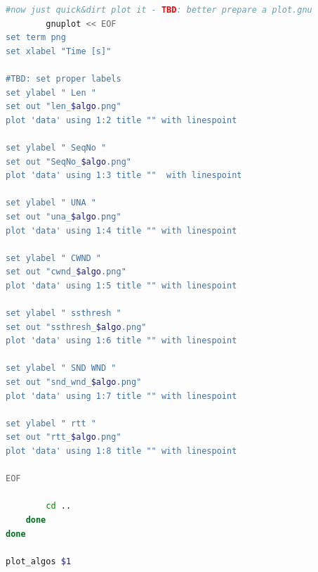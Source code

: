 \documentclass{exam}
\begin{document}
\begin{lstlisting}[language=bash]
		#now just quick&dirt plot it - TBD: better prepare a plot.gnu
		gnuplot << EOF
set term png
set xlabel "Time [s]"

#TBD: set proper labels
set ylabel " Len "
set out "len_$algo.png"
plot 'data' using 1:2 title "" with linespoint

set ylabel " SeqNo "
set out "SeqNo_$algo.png" 
plot 'data' using 1:3 title ""  with linespoint

set ylabel " UNA "
set out "una_$algo.png"
plot 'data' using 1:4 title "" with linespoint

set ylabel " CWND "
set out "cwnd_$algo.png"
plot 'data' using 1:5 title "" with linespoint

set ylabel " ssthresh "
set out "ssthresh_$algo.png"
plot 'data' using 1:6 title "" with linespoint

set ylabel " SND WND "
set out "snd_wnd_$algo.png"
plot 'data' using 1:7 title "" with linespoint

set ylabel " rtt "
set out "rtt_$algo.png"
plot 'data' using 1:8 title "" with linespoint

EOF

		cd ..
	done
done

plot_algos $1
\end{lstlisting}
\end{document}
